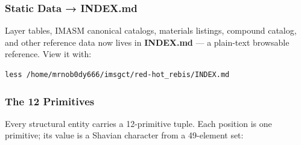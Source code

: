 \hypertarget{static-data-index.md}{%
\subsubsection{Static Data → INDEX.md}\label{static-data-index.md}}

Layer tables, IMASM canonical catalogs, materials listings, compound
catalog, and other reference data now lives in \textbf{INDEX.md} --- a
plain-text browsable reference. View it with:

\begin{verbatim}
less /home/mrnob0dy666/imsgct/red-hot_rebis/INDEX.md
\end{verbatim}

\hypertarget{the-12-primitives}{%
\subsubsection{The 12 Primitives}\label{the-12-primitives}}

Every structural entity carries a 12-primitive tuple. Each position is
one primitive; its value is a Shavian character from a 49-element set:

